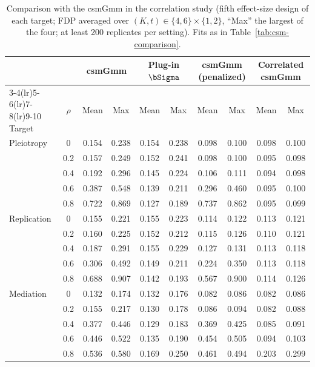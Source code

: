 \begin{table}[!htbp]
\centering
\caption{Comparison with the csmGmm in the correlation study (fifth effect-size design of each target; FDP averaged over $(K,t)\in\{4,6\}\times\{1,2\}$, ``Max'' the largest of the four; at least 200 replicates per setting). Fits as in Table~\ref{tab:csm-comparison}.}\label{tab:csm-rho}
\footnotesize
\begin{tabular}{lc cc cc cc cc}
\toprule
 & & \multicolumn{2}{c}{csmGmm} & \multicolumn{2}{c}{Plug-in $\bSigma$} & \multicolumn{2}{c}{csmGmm (penalized)} & \multicolumn{2}{c}{Correlated csmGmm}\\
\cmidrule(lr){3-4}\cmidrule(lr){5-6}\cmidrule(lr){7-8}\cmidrule(lr){9-10}
Target & $\rho$ & Mean & Max & Mean & Max & Mean & Max & Mean & Max\\
\midrule
Pleiotropy & 0 & 0.154 & 0.238 & 0.154 & 0.238 & 0.098 & 0.100 & 0.098 & 0.100\\
 & 0.2 & 0.157 & 0.249 & 0.152 & 0.241 & 0.098 & 0.100 & 0.095 & 0.098\\
 & 0.4 & 0.192 & 0.296 & 0.145 & 0.224 & 0.106 & 0.111 & 0.094 & 0.098\\
 & 0.6 & 0.387 & 0.548 & 0.139 & 0.211 & 0.296 & 0.460 & 0.095 & 0.100\\
 & 0.8 & 0.722 & 0.869 & 0.127 & 0.189 & 0.737 & 0.862 & 0.095 & 0.099\\
\midrule
Replication & 0 & 0.155 & 0.221 & 0.155 & 0.223 & 0.114 & 0.122 & 0.113 & 0.121\\
 & 0.2 & 0.160 & 0.225 & 0.152 & 0.212 & 0.115 & 0.126 & 0.110 & 0.121\\
 & 0.4 & 0.187 & 0.291 & 0.155 & 0.229 & 0.127 & 0.131 & 0.113 & 0.118\\
 & 0.6 & 0.306 & 0.492 & 0.149 & 0.211 & 0.224 & 0.350 & 0.113 & 0.118\\
 & 0.8 & 0.688 & 0.907 & 0.142 & 0.193 & 0.567 & 0.900 & 0.114 & 0.126\\
\midrule
Mediation & 0 & 0.132 & 0.174 & 0.132 & 0.176 & 0.082 & 0.086 & 0.082 & 0.086\\
 & 0.2 & 0.155 & 0.217 & 0.130 & 0.178 & 0.086 & 0.094 & 0.082 & 0.088\\
 & 0.4 & 0.377 & 0.446 & 0.129 & 0.183 & 0.369 & 0.425 & 0.085 & 0.091\\
 & 0.6 & 0.446 & 0.522 & 0.135 & 0.190 & 0.454 & 0.505 & 0.094 & 0.103\\
 & 0.8 & 0.536 & 0.580 & 0.169 & 0.250 & 0.461 & 0.494 & 0.203 & 0.299\\
\bottomrule
\end{tabular}
\end{table}

